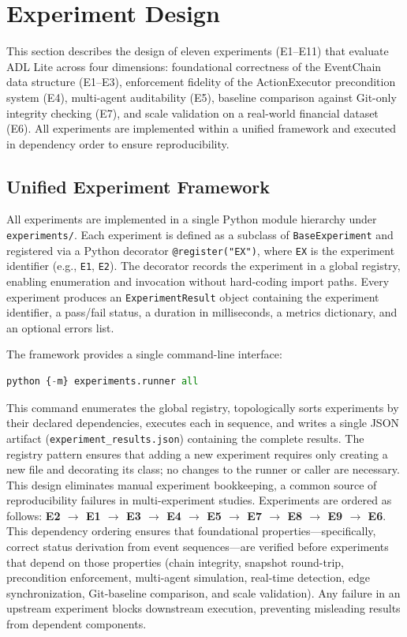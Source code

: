 \section{Experiment Design}\label{experiment-design}

This section describes the design of eleven experiments (E1--E11) that evaluate ADL Lite across four dimensions: foundational correctness of the EventChain data structure (E1--E3), enforcement fidelity of the ActionExecutor precondition system (E4), multi-agent auditability (E5), baseline comparison against Git-only integrity checking (E7), and scale validation on a real-world financial dataset (E6). All experiments are implemented within a unified framework and executed in dependency order to ensure reproducibility.

\subsection{Unified Experiment Framework}\label{unified-experiment-framework}

All experiments are implemented in a single Python module hierarchy under \texttt{experiments/}. Each experiment is defined as a subclass of \texttt{BaseExperiment} and registered via a Python decorator \texttt{@register("EX")}, where \texttt{EX} is the experiment identifier (e.g., \texttt{E1}, \texttt{E2}). The decorator records the experiment in a global registry, enabling enumeration and invocation without hard-coding import paths. Every experiment produces an \texttt{ExperimentResult} object containing the experiment identifier, a pass/fail status, a duration in milliseconds, a metrics dictionary, and an optional errors list.

The framework provides a single command-line interface:

\begin{lstlisting}[language=Python]
python {-m} experiments.runner all
\end{lstlisting}

This command enumerates the global registry, topologically sorts experiments by their declared dependencies, executes each in sequence, and writes a single JSON artifact (\texttt{experiment\_results.json}) containing the complete results. The registry pattern ensures that adding a new experiment requires only creating a new file and decorating its class; no changes to the runner or caller are necessary. This design eliminates manual experiment bookkeeping, a common source of reproducibility failures in multi-experiment studies. Experiments are ordered as follows: \textbf{E2 \(\rightarrow\) E1 \(\rightarrow\) E3 \(\rightarrow\) E4 \(\rightarrow\) E5 \(\rightarrow\) E7 \(\rightarrow\) E8 \(\rightarrow\) E9 \(\rightarrow\) E6}. This dependency ordering ensures that foundational properties---specifically, correct status derivation from event sequences---are verified before experiments that depend on those properties (chain integrity, snapshot round-trip, precondition enforcement, multi-agent simulation, real-time detection, edge synchronization, Git-baseline comparison, and scale validation). Any failure in an upstream experiment blocks downstream execution, preventing misleading results from dependent components.

